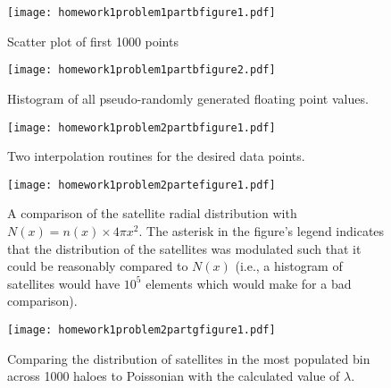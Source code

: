 \begin{figure}
    \centering
    \texttt{[image: homework1problem1partbfigure1.pdf]}
    \caption{Scatter plot of first 1000 points}
    \label{fig:11b1}
\end{figure}

\begin{figure}
    \centering
    \texttt{[image: homework1problem1partbfigure2.pdf]}
    \caption{Histogram of all pseudo-randomly generated floating point values.}
    \label{fig:11b2}
\end{figure}

\begin{figure}
    \centering
    \texttt{[image: homework1problem2partbfigure1.pdf]}
    \caption{Two interpolation routines for the desired data points.}
    \label{fig:12b1}
\end{figure}

\begin{figure}
    \centering
    \texttt{[image: homework1problem2partefigure1.pdf]}
    \caption{A comparison of the satellite radial distribution with $N(x) = n(x) \times 4\pi x^{2}$. The asterisk in the figure's legend indicates that the distribution of the satellites was modulated such that it could be reasonably compared to $N(x)$ (i.e., a histogram of satellites would have $10^{5}$ elements which would make for a bad comparison).}
    \label{fig:12e1}
\end{figure}

\begin{figure}
    \centering
    \texttt{[image: homework1problem2partgfigure1.pdf]}
    \caption{Comparing the distribution of satellites in the most populated bin across 1000 haloes to Poissonian with the calculated value of $\lambda$.}
    \label{fig:12g1}
\end{figure}
